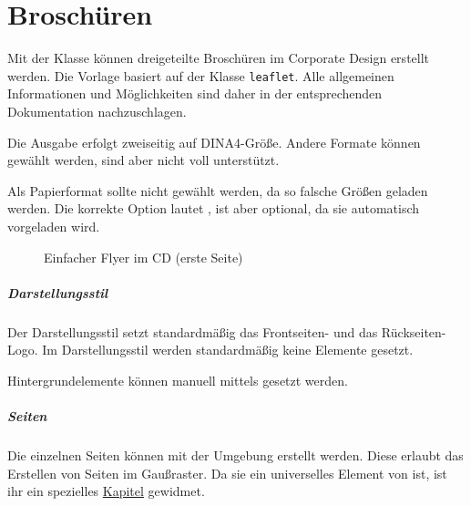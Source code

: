 \chapter{Broschüren}

Mit der Klasse  können dreigeteilte Broschüren
im Corporate Design erstellt werden.
Die Vorlage basiert auf der Klasse \texttt{leaflet}.
Alle allgemeinen Informationen und Möglichkeiten sind daher in der
entsprechenden Dokumentation\cite{cls:leaflet} nachzuschlagen.

Die Ausgabe erfolgt zweiseitig auf DINA4-Größe.
Andere Formate können gewählt werden, sind aber nicht voll unterstützt.

\begin{important}
  Als Papierformat sollte nicht  gewählt werden,
  da so falsche Größen geladen werden. Die korrekte Option lautet
  , ist aber optional, da sie automatisch vorgeladen wird.
\end{important}


\begin{figure}[!ht]
  \caption{Einfacher Flyer im CD (erste Seite)}
\end{figure}

\paragraph{Darstellungsstil}\hfill

\begin{Declaration}
\end{Declaration}

Der Darstellungsstil  setzt standardmäßig das Frontseiten- und das
Rückseiten-Logo.
Im Darstellungsstil  werden standardmäßig keine Elemente gesetzt.

Hintergrundelemente können manuell mittels  gesetzt
werden.

\paragraph{Seiten}\hfill

Die einzelnen Seiten können mit der Umgebung  erstellt
werden. Diese erlaubt das Erstellen von Seiten im Gaußraster.
Da sie ein universelles Element von \tubslatex ist, ist ihr ein spezielles
\href{chap:gausspage}{Kapitel} gewidmet.